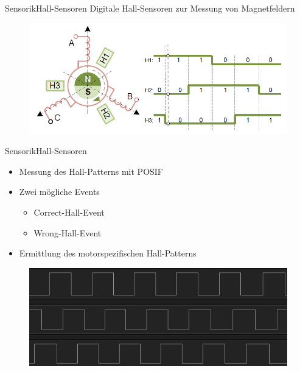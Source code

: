 \begin{frame}{Sensorik}{Hall-Sensoren}	
 Digitale Hall-Sensoren zur Messung von Magnetfeldern
 \begin{figure} [htbp]
  \centering
  \includegraphics[scale=0.4]{Sensor/hall_sample.PNG}
 \end{figure}
\end{frame}

\begin{frame}{Sensorik}{Hall-Sensoren}	
 \begin{itemize}
 \item Messung des Hall-Patterns mit POSIF
 \item Zwei mögliche Events
	 \begin{itemize}
	 \item Correct-Hall-Event
	 \item Wrong-Hall-Event
	 \end{itemize}
 \item Ermittlung des motorspezifischen Hall-Patterns
 \end{itemize}
 \begin{figure} [htbp]
   \centering
   \includegraphics[scale=0.3]{Sensor/hall_pattern.jpg}
  \end{figure}
\end{frame}

